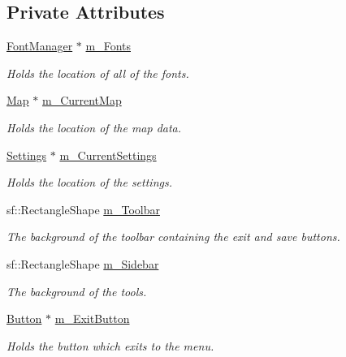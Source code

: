 \subsection*{Private Attributes}
\begin{DoxyCompactItemize}
\item 
\hyperlink{class_font_manager}{Font\+Manager} $\ast$ \hyperlink{class_editor_a836b960eec52b0362a95666cefbbb32f}{m\+\_\+\+Fonts}
\begin{DoxyCompactList}\small\item\em Holds the location of all of the fonts. \end{DoxyCompactList}\item 
\hyperlink{class_map}{Map} $\ast$ \hyperlink{class_editor_a49b6056068d36a72185438b23c62a9de}{m\+\_\+\+Current\+Map}
\begin{DoxyCompactList}\small\item\em Holds the location of the map data. \end{DoxyCompactList}\item 
\hyperlink{class_settings}{Settings} $\ast$ \hyperlink{class_editor_a8eedd353d19736035fe8836f922ed9d6}{m\+\_\+\+Current\+Settings}
\begin{DoxyCompactList}\small\item\em Holds the location of the settings. \end{DoxyCompactList}\item 
sf\+::\+Rectangle\+Shape \hyperlink{class_editor_a4bcf0251a0a5c1c5cf0b914c570689ae}{m\+\_\+\+Toolbar}
\begin{DoxyCompactList}\small\item\em The background of the toolbar containing the exit and save buttons. \end{DoxyCompactList}\item 
sf\+::\+Rectangle\+Shape \hyperlink{class_editor_aa128967ccac6c69ff1a6cec3ddbe8c6f}{m\+\_\+\+Sidebar}
\begin{DoxyCompactList}\small\item\em The background of the tools. \end{DoxyCompactList}\item 
\hyperlink{class_button}{Button} $\ast$ \hyperlink{class_editor_a0823a8e295b1b55f3c2fc658a3fd7194}{m\+\_\+\+Exit\+Button}
\begin{DoxyCompactList}\small\item\em Holds the button which exits to the menu. \end{DoxyCompactList}\item 

\end{DoxyCompactItemize}
